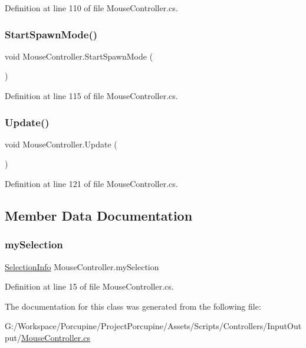 Definition at line 110 of file Mouse\+Controller.\+cs.

\mbox{\label{class_mouse_controller_a99a99423977b205150b7f05a2701f581}} 
\subsubsection{\texorpdfstring{Start\+Spawn\+Mode()}{StartSpawnMode()}}
{\footnotesize\ttfamily void Mouse\+Controller.\+Start\+Spawn\+Mode (\begin{DoxyParamCaption}{ }\end{DoxyParamCaption})}



Definition at line 115 of file Mouse\+Controller.\+cs.

\mbox{\label{class_mouse_controller_ac9b2f0fae750d7128123db59fe99c6d5}} 
\subsubsection{\texorpdfstring{Update()}{Update()}}
{\footnotesize\ttfamily void Mouse\+Controller.\+Update (\begin{DoxyParamCaption}{ }\end{DoxyParamCaption})}



Definition at line 121 of file Mouse\+Controller.\+cs.



\subsection{Member Data Documentation}
\mbox{\label{class_mouse_controller_ac4180c166ce9084e0f817ab7e7f930fd}} 
\subsubsection{\texorpdfstring{my\+Selection}{mySelection}}
{\footnotesize\ttfamily \hyperlink{class_selection_info}{Selection\+Info} Mouse\+Controller.\+my\+Selection}



Definition at line 15 of file Mouse\+Controller.\+cs.



The documentation for this class was generated from the following file\+:\begin{DoxyCompactItemize}
\item 
G\+:/\+Workspace/\+Porcupine/\+Project\+Porcupine/\+Assets/\+Scripts/\+Controllers/\+Input\+Output/\hyperlink{_mouse_controller_8cs}{Mouse\+Controller.\+cs}\end{DoxyCompactItemize}
